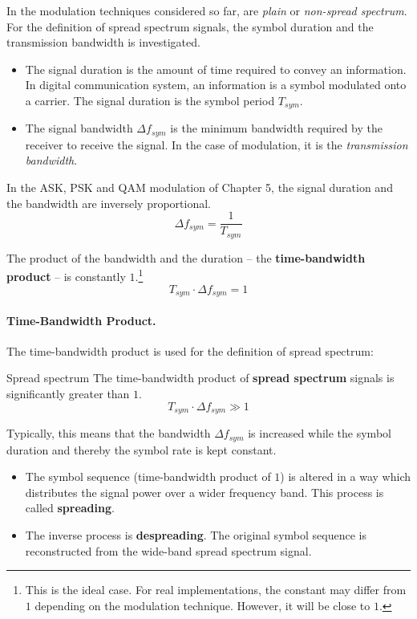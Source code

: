 \begin{refsection}
In the modulation techniques considered so far, are \emph{plain} or \emph{non-spread spectrum}. For the definition of spread spectrum signals, the symbol duration and the transmission bandwidth is investigated.
\begin{itemize}
	\item The signal duration is the amount of time required to convey an information. In digital communication system, an information is a symbol modulated onto a carrier. The signal duration is the symbol period $T_{sym}$.
	\item The signal bandwidth $\Delta f_{sym}$ is the minimum bandwidth required by the receiver to receive the signal. In the case of modulation, it is the \emph{transmission bandwidth}.
\end{itemize}
In the \ac{ASK}, \ac{PSK} and \ac{QAM} modulation of Chapter 5, the signal duration and the bandwidth are inversely proportional.
\begin{equation}
	\Delta f_{sym} = \frac{1}{T_{sym}}
\end{equation}

The product of the bandwidth and the duration -- the  \textbf{time-bandwidth product} -- is constantly $1$.\footnote{This is the ideal case. For real implementations, the constant may differ from $1$ depending on the modulation technique. However, it will be close to $1$.}
\begin{equation}
	T_{sym} \cdot \Delta f_{sym} = 1
\end{equation}

\paragraph{Time-Bandwidth Product.}

The time-bandwidth product is used for the definition of spread spectrum:
\begin{definition}{Spread spectrum}
	The time-bandwidth product of  \textbf{spread spectrum} signals is significantly greater than $1$.
	\begin{equation}
		T_{sym} \cdot \Delta f_{sym} \gg 1
	\end{equation}
\end{definition}

Typically, this means that the bandwidth $\Delta f_{sym}$ is increased while the symbol duration and thereby the symbol rate is kept constant.
\begin{itemize}
	\item The symbol sequence (time-bandwidth product of $1$) is altered in a way which distributes the signal power over a wider frequency band. This process is called  \textbf{spreading}.
	\item The inverse process is  \textbf{despreading}. The original symbol sequence is reconstructed from the wide-band spread spectrum signal.
\end{itemize}


\end{refsection}
